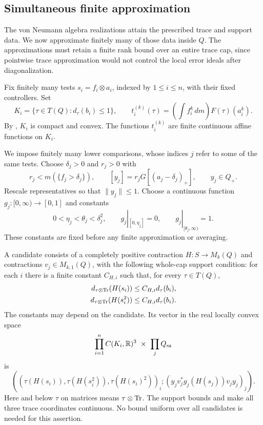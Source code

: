 \subsection{Simultaneous finite approximation}

The von Neumann algebra realizations attain the prescribed trace and
support data. We now approximate finitely many of those data inside
$Q$. The approximations must retain a finite rank bound over an entire
trace cap, since pointwise trace approximation would not control the
local error ideals after diagonalization.

Fix finitely many tests $s_i=f_i\otimes a_i$, indexed by $1\leq i\leq n$,
with their fixed controllers.  Set
\begin{equation}\label{tc:caps-targets}
 K_i=\{\tau\in T(Q):d_\tau(b_i)\leq1\},\qquad
 t_i^{(k)}(\tau)=\left(\int f_i^k\,dm\right)F(\tau)(a_i^k).
\end{equation}
By , $K_i$ is compact and convex.  The functions
$t_i^{(k)}$ are finite continuous affine functions on $K_i$.

We impose finitely many lower comparisons, whose indices $j$ refer to
some of the same tests.  Choose $\delta_j>0$ and $r_j>0$ with
\begin{equation}\label{tc:lower-data}
 r_j<m(\{f_j>\delta_j\}),\qquad
 [y_j]=r_jG[(a_j-\delta_j)_+],\qquad y_j\in Q_+.
\end{equation}
Rescale representatives so that $\|y_j\|\leq1$.  Choose a continuous
function $g_j:[0,\infty)\to[0,1]$ and constants
\begin{equation}\label{tc:fixed-slack}
 0<\eta_j<\theta_j<\delta_j^2,
 \qquad g_j|_{[0,\eta_j]}=0,
 \qquad g_j|_{[\theta_j,\infty)}=1.
\end{equation}
These constants are fixed before any finite approximation or averaging.

A candidate consists of a completely positive contraction
$H:S\to M_k(Q)$ and contractions $v_j\in M_{k,1}(Q)$, with the following
whole-cap support condition: for each $i$ there is a finite constant
$C_{H,i}$ such that, for every $\tau\in T(Q)$,
\begin{equation}\label{tc:candidate-rank}
 \begin{split}
 d_{\tau\otimes\operatorname{Tr}}(H(s_i))&\leq C_{H,i}d_\tau(b_i),\\
 d_{\tau\otimes\operatorname{Tr}}(H(s_i^2))&\leq C_{H,i}d_\tau(b_i).
 \end{split}
\end{equation}
The constants may depend on the candidate.  Its vector in the real
locally convex space
\[
 \prod_{i=1}^n C(K_i,\mathbb R)^3\ \times\ \prod_j Q_{\mathrm{sa}}
\]
is
\begin{equation}\label{tc:candidate-vector}
 \left(
 (\tau(H(s_i)),\tau(H(s_i^2)),\tau(H(s_i)^2))_i;
 (y_jv_j^*g_j(H(s_j))v_jy_j)_j
 \right).
\end{equation}
Here and below $\tau$ on matrices means $\tau\otimes\operatorname{Tr}$.
The support bounds and  make all three trace
coordinates continuous.  No bound uniform over all candidates is
needed for this assertion.

